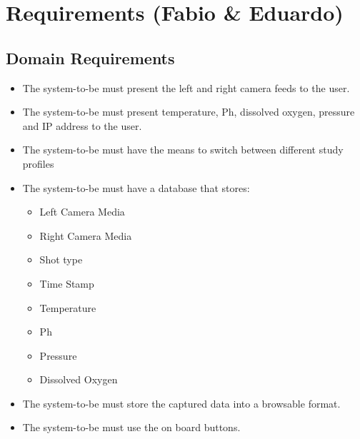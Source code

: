 \section{Requirements (Fabio \& Eduardo)}
\subsection{Domain Requirements}
\begin{itemize}
	\item The system-to-be must present the left and right camera feeds to the user.
	\item The system-to-be must present temperature, Ph, dissolved oxygen, pressure and IP address to the user.
	\item The system-to-be must have the means to switch between different study profiles
	\item The system-to-be must have a database that stores:
	      \begin{itemize}
		      \item Left Camera Media
		      \item Right Camera Media
		      \item Shot type
		      \item Time Stamp
		      \item Temperature
		      \item Ph
		      \item Pressure
		      \item Dissolved Oxygen
	      \end{itemize}
	\item The system-to-be must store the captured data into a browsable format.
	\item The system-to-be must use the on board buttons.
\end{itemize}
